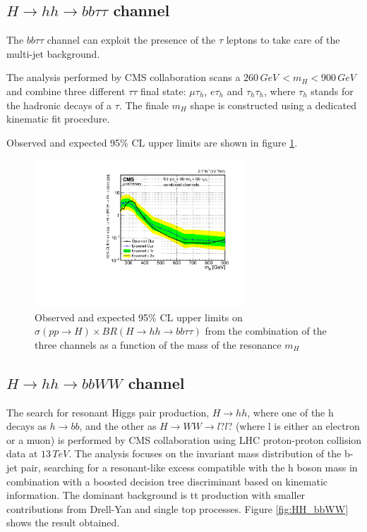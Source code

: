 \subsection{$H\rightarrow hh \rightarrow bb\tau\tau$ channel}
The $bb\tau\tau$ channel can exploit the presence of the $\tau$ leptons to take care of the multi-jet background.

The analysis performed by CMS collaboration scans a $260\, GeV \, < m_{H}  <  900 \, GeV$ and combine three different $\tau\tau$ final state: $\mu\tau_h$, $e\tau_h$ and $\tau_h\tau_h$, where $\tau_h$ stands for the hadronic decays of a $\tau$. 
The finale $m_H$ shape is constructed using a dedicated kinematic fit procedure.

Observed and expected 95\% CL upper limits are shown in figure \ref{fig:HH_bbtt}.


\begin{figure}[htb]
\centering
	\includegraphics[width=0.7\textwidth, angle=0] {figures/H_hh_bbtautau_CMS_BR.pdf}
\caption{Observed and expected 95\% CL upper limits on $\sigma(pp\rightarrow H) \times BR(H \rightarrow hh \rightarrow bb\tau\tau)$
from the combination of the three channels as a function of the mass of the resonance $m_H$}
\label{fig:HH_bbtt}   
\end{figure}

\subsection{$H\rightarrow hh \rightarrow bbWW$ channel}
The search for resonant Higgs pair production, $H \rightarrow hh$, where one of the h decays as $h\rightarrow bb$, and the other as $H \rightarrow WW \rightarrow l?l?$ (where l is either an electron or a muon) is performed by CMS collaboration using LHC proton-proton collision data at $13\, TeV$. The analysis focuses on the invariant mass distribution of the b-jet pair, searching for a resonant-like excess compatible with the h boson mass in combination with a boosted decision tree discriminant based on kinematic information. The dominant background is tt production with smaller contributions
from Drell-Yan and single top processes. Figure \ref{fig:HH_bbWW} shows the result obtained.

